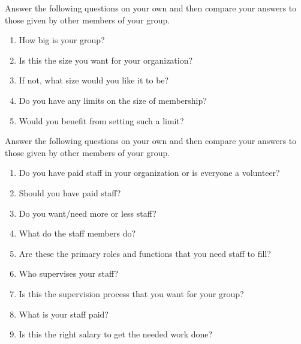 
Answer the following questions on your own
and then compare your answers to those given by other members of your group.

\begin{enumerate}

\item
  How big is your group?

\item
  Is this the size you want for your organization?

\item
  If not, what size would you like it to be?

\item
  Do you have any limits on the size of membership?

\item
  Would you benefit from setting such a limit?

\end{enumerate}


Answer the following questions on your own
and then compare your answers to those given by other members of your group.

\begin{enumerate}

\item
  Do you have paid staff in your organization
  or is everyone a volunteer?

\item
  Should you have paid staff?

\item
  Do you want/need more or less staff?

\item
  What do the staff members do?

\item
  Are these the primary roles and functions that you need staff to fill?

\item
  Who supervises your staff?

\item
  Is this the supervision process that you want for your group?

\item
  What is your staff paid?

\item
  Is this the right salary to get the needed work done?

\end{enumerate}

